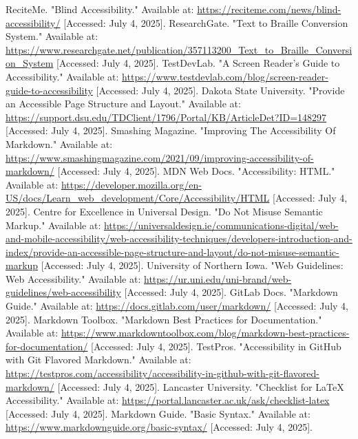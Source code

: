 \begin{thebibliography}{99}
 ReciteMe. "Blind Accessibility." Available at: \url{https://reciteme.com/news/blind-accessibility/} [Accessed: July 4, 2025].
 ResearchGate. "Text to Braille Conversion System." Available at: \url{https://www.researchgate.net/publication/357113200_Text_to_Braille_Conversion_System} [Accessed: July 4, 2025].
 TestDevLab. "A Screen Reader’s Guide to Accessibility." Available at: \url{https://www.testdevlab.com/blog/screen-reader-guide-to-accessibility} [Accessed: July 4, 2025].
 Dakota State University. "Provide an Accessible Page Structure and Layout." Available at: \url{https://support.dsu.edu/TDClient/1796/Portal/KB/ArticleDet?ID=148297} [Accessed: July 4, 2025].
 Smashing Magazine. "Improving The Accessibility Of Markdown." Available at: \url{https://www.smashingmagazine.com/2021/09/improving-accessibility-of-markdown/} [Accessed: July 4, 2025].
 MDN Web Docs. "Accessibility: HTML." Available at: \url{https://developer.mozilla.org/en-US/docs/Learn_web_development/Core/Accessibility/HTML} [Accessed: July 4, 2025].
 Centre for Excellence in Universal Design. "Do Not Misuse Semantic Markup." Available at: \url{https://universaldesign.ie/communications-digital/web-and-mobile-accessibility/web-accessibility-techniques/developers-introduction-and-index/provide-an-accessible-page-structure-and-layout/do-not-misuse-semantic-markup} [Accessed: July 4, 2025].
 University of Northern Iowa. "Web Guidelines: Web Accessibility." Available at: \url{https://ur.uni.edu/uni-brand/web-guidelines/web-accessibility} [Accessed: July 4, 2025].
 GitLab Docs. "Markdown Guide." Available at: \url{https://docs.gitlab.com/user/markdown/} [Accessed: July 4, 2025].
 Markdown Toolbox. "Markdown Best Practices for Documentation." Available at: \url{https://www.markdowntoolbox.com/blog/markdown-best-practices-for-documentation/} [Accessed: July 4, 2025].
 TestPros. "Accessibility in GitHub with Git Flavored Markdown." Available at: \url{https://testpros.com/accessibility/accessibility-in-github-with-git-flavored-markdown/} [Accessed: July 4, 2025].
 Lancaster University. "Checklist for LaTeX Accessibility." Available at: \url{https://portal.lancaster.ac.uk/ask/checklist-latex} [Accessed: July 4, 2025].
 Markdown Guide. "Basic Syntax." Available at: \url{https://www.markdownguide.org/basic-syntax/} [Accessed: July 4, 2025].

\end{thebibliography}
